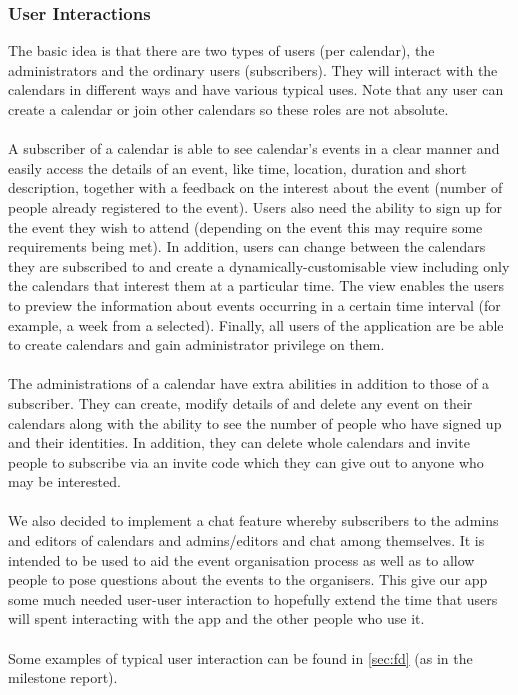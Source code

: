 \documentclass[10pt,a4paper]{article}
\begin{document}
\subsubsection{User Interactions}
The basic idea is that there are two types of users (per calendar), the administrators and the ordinary users (subscribers). They will interact with the calendars in diﬀerent ways and have various typical uses. Note that any user can create a calendar or join other calendars so these roles are not absolute.
\\
\\
\noindent
A subscriber of a calendar is able to see calendar’s events in a clear manner and easily access the details of an event, like time, location, duration and short description, together with a feedback on the interest about the event (number of people already registered to the event). Users also need the ability to sign up for the event they wish to attend (depending on the event this may require some requirements being met). In addition, users can change between the calendars they are subscribed to and create a dynamically-customisable view including only the calendars that interest them at a particular time. The view enables the users to preview the information about events occurring in a certain time interval (for example, a week from a selected). Finally, all users of the application are be able to create calendars and gain administrator privilege on them.
\\
\\
\noindent
The administrations of a calendar have extra abilities in addition to those of a subscriber. They can create, modify details of and delete any event on their calendars along with the ability to see the number of people who have signed up and their identities. In addition, they can delete whole calendars and invite people to subscribe via an invite code which they can give out to anyone who may be interested.
\\
\\
\noindent
We also decided to implement a chat feature whereby subscribers to the admins and editors of calendars and admins/editors and chat among themselves. It is intended to be used to aid the event organisation process as well as to allow people to pose questions about the events to the organisers. This give our app some much needed user-user interaction to hopefully extend the time that users will spent interacting with the app and the other people who use it.
\\
\\
\noindent Some examples of typical user interaction can be found in \cref{sec:fd} (as in the milestone report).   
\end{document}
